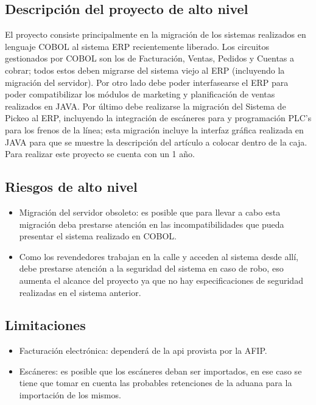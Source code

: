 \documentclass{article}
\begin{document}
\medskip


\subsection{Descripción del proyecto de alto nivel}

	El proyecto consiste principalmente en la migración de los sistemas realizados en lenguaje COBOL al sistema ERP recientemente liberado. Los circuitos gestionados por COBOL son los de Facturación, Ventas, Pedidos y Cuentas a cobrar; todos estos deben migrarse del sistema viejo al ERP (incluyendo la migración del servidor). Por otro lado debe poder interfasearse el ERP para poder compatibilizar los módulos de marketing y planificación de ventas realizados en JAVA. Por último debe realizarse la migración del Sistema de Pickeo al ERP, incluyendo la integración de escáneres para y programación PLC's para los frenos de la línea; esta migración incluye la interfaz gráfica realizada en JAVA para que se muestre la descripción del artículo a colocar dentro de la caja. 
Para realizar este proyecto se cuenta con un 1 año.

\medskip


\subsection{Riesgos de alto nivel}

	\begin{itemize}
	\itemsep=3pt \topsep=0pt \partopsep=0pt \parskip=0pt \parsep=0pt
	\item Migración del servidor obsoleto: es posible que para llevar a cabo esta migración deba prestarse atención en las incompatibilidades que pueda presentar el sistema realizado en COBOL. 
	\item Como los revendedores trabajan en la calle y acceden al sistema desde allí, debe prestarse atención a la seguridad del sistema en caso de robo, eso aumenta el alcance del proyecto ya que no hay especificaciones de seguridad realizadas en el sistema anterior.
	
	\end{itemize}
\medskip


\subsection{Limitaciones}

	\begin{itemize}
		\itemsep=3pt \topsep=0pt \partopsep=0pt \parskip=0pt \parsep=0pt
		\item Facturación electrónica: dependerá de la api provista por la AFIP.
		\item Escáneres: es posible que los escáneres deban ser importados, en ese caso se tiene que tomar en cuenta las probables retenciones de la aduana para la importación de los mismos. 
	\end{itemize}
\end{document}

